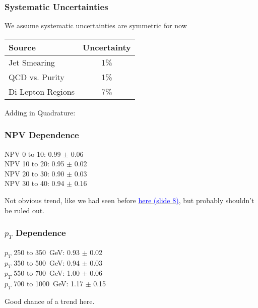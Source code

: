 \documentclass{beamer}
\begin{document}
\begin{frame}
  \frametitle{Systematic Uncertainties}
  We assume systematic uncertainties are symmetric for now
  \begin{center}
  \begin{tabular}{l|c}
    Source & Uncertainty \\
    \hline
    Jet Smearing & 1\% \\
    QCD vs. Purity & 1\% \\
    Di-Lepton Regions & 7\% \\
  \end{tabular}
  \end{center}
  Adding in Quadrature: 
  \vspace{12pt}
\end{frame}

\begin{frame}
  \frametitle{NPV Dependence}

  \begin{center}

    NPV 0 to 10: 0.99 $\pm$ 0.06 \\
    NPV 10 to 20: 0.95 $\pm$ 0.02 \\
    NPV 20 to 30: 0.90 $\pm$ 0.03 \\ 
    NPV 30 to 40: 0.94 $\pm$ 0.16

  \end{center}

  Not obvious trend, like we had seen before
  \href{http://t3serv001.mit.edu/~dabercro/docs/FakeTagStudy/dabercro_MonoV_161109.pdf}
       {\textcolor{blue}{here (slide 8)}},
  but probably shouldn't be ruled out.

\end{frame}

\begin{frame}
  \frametitle{$p_T$ Dependence}

  \begin{center}

    $p_T$ 250 to \SI{350}{GeV}: 0.93 $\pm$ 0.02 \\
    $p_T$ 350 to \SI{500}{GeV}: 0.94 $\pm$ 0.03 \\
    $p_T$ 550 to \SI{700}{GeV}: 1.00 $\pm$ 0.06 \\
    $p_T$ 700 to \SI{1000}{GeV}: 1.17 $\pm$ 0.15 \\

  \end{center}

  Good chance of a trend here.

\end{frame}
\end{document}
